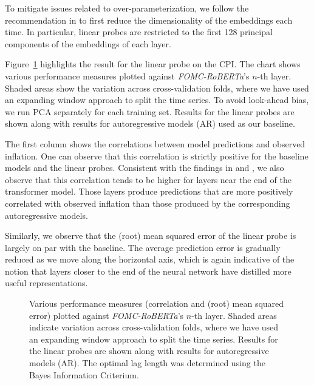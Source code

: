\documentclass{article}
\theoremstyle{plain}
\theoremstyle{definition}
\theoremstyle{remark}
\begin{document}
To mitigate issues related to over-parameterization, we follow the recommendation in \cite{alain2018understanding} to first reduce the dimensionality of the embeddings each time. In particular, linear probes are restricted to the first 128 principal components of the embeddings
of each layer.

Figure~\ref{fig-fomc} highlights the result for the linear probe
on the CPI. The chart shows various performance measures plotted against
\emph{FOMC-RoBERTa}'s \(n\)-th layer. Shaded areas show the variation
across cross-validation folds, where we have used an expanding window
approach to split the time series. To avoid look-ahead bias, we run PCA
separately for each training set. Results for the linear probes are
shown along with results for autoregressive models (AR) used as our
baseline.

The first column shows the correlations between model predictions and
observed inflation. One can observe that this correlation is strictly
positive for the baseline models and the linear probes. Consistent with
the findings in \cite{gurnee2023language} and \cite{alain2018understanding},
we also observe that this correlation tends to be higher for layers near
the end of the transformer model. Those layers produce predictions that
are more positively correlated with observed inflation than those
produced by the corresponding autoregressive models.

Similarly, we observe that the (root) mean squared error of the linear
probe is largely on par with the baseline. The average prediction error
is gradually reduced as we move along the horizontal axis, which is
again indicative of the notion that layers closer to the end of the
neural network have distilled more useful representations.

\begin{figure}


\caption{\label{fig-fomc}Various performance measures (correlation and
(root) mean squared error) plotted against \emph{FOMC-RoBERTa}'s
\(n\)-th layer. Shaded areas indicate variation across cross-validation
folds, where we have used an expanding window approach to split the time
series. Results for the linear probes are shown along with results for
autoregressive models (AR). The optimal lag length was determined using
the Bayes Information Criterium.}

\end{figure}%
\end{document}
